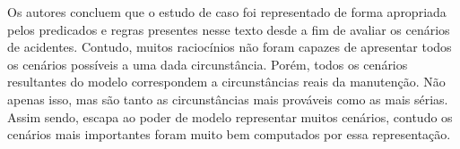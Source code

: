 Os autores concluem que o estudo de caso foi representado de forma apropriada pelos predicados e regras presentes nesse texto desde a fim de avaliar os cenários de acidentes. Contudo, muitos raciocínios não foram capazes de apresentar todos os cenários possíveis a uma dada circunstância. Porém, todos os cenários resultantes do modelo correspondem a circunstâncias reais da manutenção. Não apenas isso, mas são tanto as circunstâncias mais prováveis como as mais sérias. Assim sendo, escapa ao poder de modelo representar muitos cenários, contudo os cenários mais importantes foram muito bem computados por essa representação.